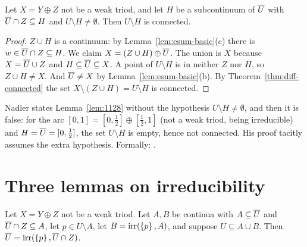 
\begin{lemma}\label{lem:1128}
Let $X=Y\oplus Z$ not be a weak triod, and let $H$ be a subcontinuum of $\overline{U}$ with $\overline{U}\cap
Z\subseteq H$ and $U\setminus H\ne\emptyset$. Then $U\setminus H$ is connected.
\end{lemma}

\begin{proof}
$Z\cup H$ is a continuum: by Lemma~\ref{lem:esum-basic}(c) there is $w\in\overline{U}\cap Z\subseteq H$. We
claim $X=(Z\cup H)\oplus\overline{U}$. The union is $X$ because $X=\overline{U}\cup Z$ and $H\subseteq\overline{U}\subseteq X$. A
point of $U\setminus H$ is in neither $Z$ nor $H$, so $Z\cup H\ne X$. And $\overline{U}\neq X$ by
Lemma~\ref{lem:esum-basic}(b). By Theorem~\ref{thm:diff-connected} the set $X\setminus(Z\cup
H)=U\setminus H$ is connected.
\end{proof}


\begin{remark}\label{rem:1128-false}
Nadler states Lemma~\ref{lem:1128} without the hypothesis $U\setminus H\neq\emptyset$, and then it is
false: for the arc $[0,1]=[0,\frac12]\oplus[\frac12,1]$ (not a weak triod, being irreducible) and
$H=\overline{U}=[0,\frac12]$, the set $U\setminus H$ is empty, hence not connected. His proof tacitly
assumes the extra hypothesis. Formally: .
\end{remark}

\section{Three lemmas on irreducibility}

\begin{proposition}\label{prop:1131}
Let $X=Y\oplus Z$ not be a weak triod. Let $A,B$ be continua with $A\subseteq\overline{U}$ and $\overline{U}\cap
Z\subseteq A$, let $p\in U\setminus A$, let $B=\operatorname{irr}(\left\{ p \right\},A)$, and suppose $U\subseteq A\cup B$. Then
$\overline{U}=\operatorname{irr}(\left\{ p \right\},\overline{U}\cap Z)$.
\end{proposition}

